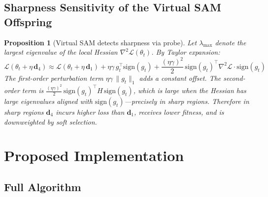 \documentclass[12pt]{article}
\newtheorem{proposition}{Proposition}
\newcommand{\Loss}{\mathcal{L}}
\newcommand{\sign}{\mathrm{sign}}
\begin{document}
\subsection{Sharpness Sensitivity of the Virtual SAM Offspring}

\begin{proposition}[Virtual SAM detects sharpness via probe]
\label{prop:sam}
Let $\lambda_{\max}$ denote the largest eigenvalue of the local Hessian
$\nabla^2 \Loss(\theta_t)$.
By Taylor expansion:
\begin{equation*}
  \Loss(\theta_t + \eta\,\mathbf{d}_4) \approx
  \Loss(\theta_t + \eta\,\mathbf{d}_1)
  + \eta\gamma\, g_t^\top \sign(g_t)
  + \frac{(\eta\gamma)^2}{2}\, \sign(g_t)^\top
    \nabla^2 \Loss \cdot \sign(g_t)
\end{equation*}
The first-order perturbation term $\eta\gamma\,\|g_t\|_1$ adds a
constant offset.
The second-order term is
$\frac{(\eta\gamma)^2}{2}\,\sign(g_t)^\top H\,\sign(g_t)$,
which is large when the Hessian has large eigenvalues aligned with
$\sign(g_t)$---precisely in sharp regions.
Therefore in sharp regions $\mathbf{d}_4$ incurs higher loss than
$\mathbf{d}_1$, receives lower fitness, and is downweighted by
soft selection.
\end{proposition}


\section{Proposed Implementation}
\label{sec:implementation}

\subsection{Full Algorithm}
\end{document}
